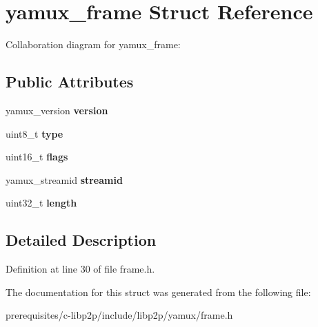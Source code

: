 \hypertarget{structyamux__frame}{}\section{yamux\+\_\+frame Struct Reference}
\label{structyamux__frame}


Collaboration diagram for yamux\+\_\+frame\+:
\subsection*{Public Attributes}
\begin{DoxyCompactItemize}
\item 
\mbox{\label{structyamux__frame_a800430fca33ff0768025ead9c68a770c}} 
yamux\+\_\+version {\bfseries version}
\item 
\mbox{\label{structyamux__frame_a36e4ab57e6fd6424f23d82e170b91b92}} 
uint8\+\_\+t {\bfseries type}
\item 
\mbox{\label{structyamux__frame_ac9b0cf2059597edd7acc59505ef9d6f3}} 
uint16\+\_\+t {\bfseries flags}
\item 
\mbox{\label{structyamux__frame_a5a8e26be5f2f2e71568f0a8c9755e91c}} 
yamux\+\_\+streamid {\bfseries streamid}
\item 
\mbox{\label{structyamux__frame_a260b1f25d1090c279cdd611609cda3f6}} 
uint32\+\_\+t {\bfseries length}
\end{DoxyCompactItemize}


\subsection{Detailed Description}


Definition at line 30 of file frame.\+h.



The documentation for this struct was generated from the following file\+:\begin{DoxyCompactItemize}
\item 
prerequisites/c-\/libp2p/include/libp2p/yamux/frame.\+h\end{DoxyCompactItemize}
